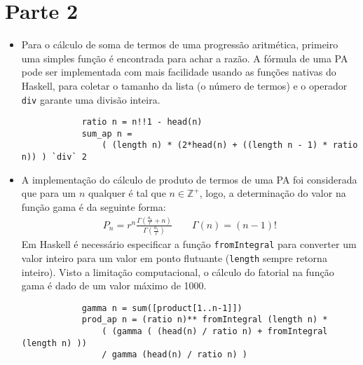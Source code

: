 \documentclass{article}
\begin{document}
    \section*{Parte 2}
        \begin{itemize}
            \item Para o cálculo de soma de termos de uma progressão aritmética, primeiro uma simples
            função é encontrada para achar a razão. A fórmula de uma PA pode ser implementada com mais
            facilidade usando as funções nativas do Haskell, para coletar o tamanho da lista (o número de
            termos) e o operador \texttt{div} garante uma divisão inteira.
            \begin{verbatim}
            ratio n = n!!1 - head(n)
            sum_ap n = 
                ( (length n) * (2*head(n) + ((length n - 1) * ratio n)) ) `div` 2
            \end{verbatim}
            
            \item A implementação do cálculo de produto de termos de uma PA foi considerada que para um $n$
            qualquer é tal que $n \in \mathbb{Z^{+}}$, logo, a determinação do valor na função
            gama é da seguinte forma:
            \begin{gather*}
            P_{n} = r^{n}\frac{\Gamma(\frac{a_{1}}{r} + n)}{\Gamma(\frac{a_{1}}{r})} \qquad 
            \Gamma(n) = (n-1)!
            \end{gather*}
            Em Haskell é necessário especificar a função \texttt{fromIntegral} para converter um valor
            inteiro para um valor em ponto flutuante (\texttt{length} sempre retorna inteiro). Visto a
            limitação computacional, o cálculo do fatorial na função gama é dado de um valor máximo de
            1000.
            \begin{verbatim}
            gamma n = sum([product[1..n-1]])
            prod_ap n = (ratio n)** fromIntegral (length n) *
                ( (gamma ( (head(n) / ratio n) + fromIntegral (length n) ))
                / gamma (head(n) / ratio n) )
            \end{verbatim}
            
        \end{itemize}
\end{document}
